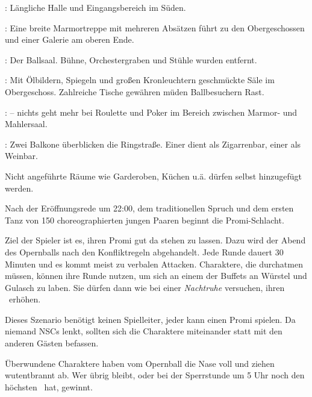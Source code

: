 {		: Längliche Halle und Eingangsbereich im Süden.

		: Eine breite Marmortreppe mit mehreren Absätzen führt zu den Obergeschossen und einer Galerie am oberen Ende.

		: Der Ballsaal. Bühne, Orchestergraben und  Stühle wurden entfernt.

		: Mit Ölbildern, Spiegeln und großen Kronleuchtern geschmückte Säle im Obergeschoss. Zahlreiche Tische gewähren müden Ballbesuchern Rast.

		:  -- nichts geht mehr bei Roulette und Poker im Bereich zwischen Marmor- und Mahlersaal.

		: Zwei Balkone überblicken die Ringstraße. Einer dient als Zigarrenbar, einer als Weinbar.

		Nicht angeführte Räume wie Garderoben, Küchen u.ä. dürfen selbst hinzugefügt werden.


		\noindent
		Nach der Eröffnungsrede um 22:00, dem traditionellen Spruch  und dem ersten Tanz von 150 choreographierten jungen Paaren beginnt die Promi-Schlacht.

		Ziel der Spieler ist es, ihren Promi gut da stehen zu lassen. Dazu wird der Abend des Opernballs nach den Konfliktregeln abgehandelt. Jede Runde dauert 30 Minuten und es kommt meist zu verbalen Attacken. Charaktere, die durchatmen müssen, können ihre Runde nutzen, um sich an einem der Buffets an Würstel und Gulasch zu laben. Sie dürfen dann wie bei einer \emph{Nachtruhe} versuchen, ihren \HD~erhöhen.

		Dieses Szenario benötigt keinen Spielleiter, jeder kann einen Promi spielen. Da niemand NSCs lenkt, sollten sich die Charaktere miteinander statt mit den anderen Gästen befassen.

		Überwundene Charaktere haben vom Opernball die Nase voll und ziehen wutentbrannt ab. Wer übrig bleibt, oder bei der Sperrstunde um 5 Uhr noch den höchsten \HD~hat, gewinnt.
}

